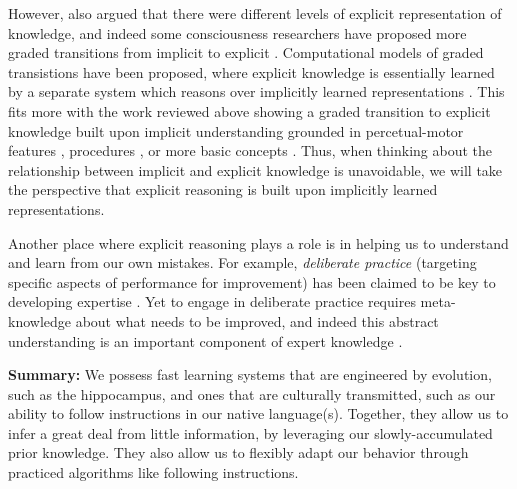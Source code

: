 However, \citet{Karmiloff-Smith1986} also argued that there were different levels of explicit representation of knowledge, and indeed some consciousness researchers have proposed more graded transitions from implicit to explicit \citep[e.g.][]{Cleeremans2002}. Computational models of graded transistions have been proposed, where explicit knowledge is essentially learned by a separate system which reasons over implicitly learned representations \citep{Cleeremans2014}. This fits more with the work reviewed above showing a graded transition to explicit knowledge built upon implicit understanding grounded in percetual-motor features \citep[e.g.][]{Goldin-Meadow1993}, procedures \citep[e.g.][]{Hazzan1999}, or more basic concepts \citep{Wilensky1991, Patel2018}. Thus, when thinking about the relationship between implicit and explicit knowledge is unavoidable, we will take the perspective that explicit reasoning is built upon implicitly learned representations. \par 
Another place where explicit reasoning plays a role is in helping us to understand and learn from our own mistakes. For example, \emph{deliberate practice} (targeting specific aspects of performance for improvement) has been claimed to be key to developing expertise \citep{Ericsson1993, Ericsson2017}. Yet to engage in deliberate practice requires meta-knowledge about what needs to be improved, and indeed this abstract understanding is an important component of expert knowledge \citep{Feltovich2012}. \par
\textbf{Summary:} We possess fast learning systems that are engineered by evolution, such as the hippocampus, and ones that are culturally transmitted, such as our ability to follow instructions in our native language(s). Together, they allow us to infer a great deal from little information, by leveraging our slowly-accumulated prior knowledge. They also allow us to flexibly adapt our behavior through practiced algorithms like following instructions. \par 

